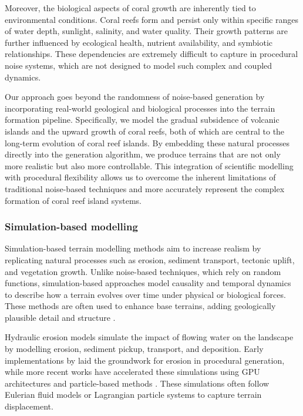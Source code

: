 Moreover, the biological aspects of coral growth are inherently tied to environmental conditions. Coral reefs form and persist only within specific ranges of water depth, sunlight, salinity, and water quality. Their growth patterns are further influenced by ecological health, nutrient availability, and symbiotic relationships. These dependencies are extremely difficult to capture in procedural noise systems, which are not designed to model such complex and coupled dynamics.

Our approach goes beyond the randomness of noise-based generation by incorporating real-world geological and biological processes into the terrain formation pipeline. Specifically, we model the gradual subsidence of volcanic islands and the upward growth of coral reefs, both of which are central to the long-term evolution of coral reef islands. By embedding these natural processes directly into the generation algorithm, we produce terrains that are not only more realistic but also more controllable. This integration of scientific modelling with procedural flexibility allows us to overcome the inherent limitations of traditional noise-based techniques and more accurately represent the complex formation of coral reef island systems.

\subsubsection{Simulation-based modelling}

Simulation-based terrain modelling methods aim to increase realism by replicating natural processes such as erosion, sediment transport, tectonic uplift, and vegetation growth. Unlike noise-based techniques, which rely on random functions, simulation-based approaches model causality and temporal dynamics to describe how a terrain evolves over time under physical or biological forces. These methods are often used to enhance base terrains, adding geologically plausible detail and structure \cite{Benes2006, Smelik2009}.


Hydraulic erosion models simulate the impact of flowing water on the landscape by modelling erosion, sediment pickup, transport, and deposition. Early implementations by \cite{Musgrave1989} laid the groundwork for erosion in procedural generation, while more recent works have accelerated these simulations using GPU architectures \cite{Mei2007} and particle-based methods \cite{Neidhold2005}. These simulations often follow Eulerian fluid models or Lagrangian particle systems to capture terrain displacement.

